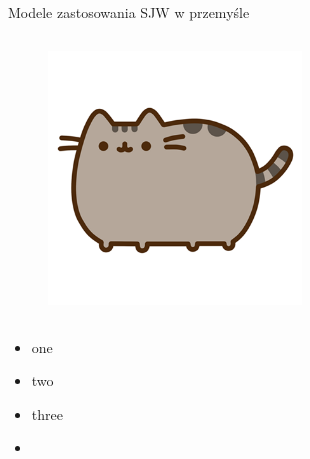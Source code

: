 \begin{columnframe}{Modele zastosowania SJW w przemyśle}
    \begin{column}{0.5\textwidth}
        \begin{figure}
            \centering
            \includegraphics[width=0.6\textwidth, frame]{images/pusheen.png}
        \end{figure}
    \end{column}
    \begin{column}{0.5\textwidth}
        \begin{itemize}
            \item one \keV
            \item two \MeV
            \item three \GeV
            \item \aegis
        \end{itemize}
    \end{column}
\end{columnframe}

